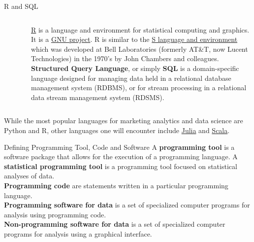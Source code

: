 \documentclass[pdf]{beamer}
\newcommand{\empr}[1]{{\color{franklinblue}\textbf{#1}}}
\theoremstyle{remark}
\theoremstyle{definition}
\begin{document}
\begin{frame}[t]{R and SQL}
\begin{columns}[T]
\begin{column}{0.2\textwidth}
\begin{figure}[htbp]
  \captionsetup{justification=centering}
  \includegraphics[height=1.0cm, trim=0.1cm 0.1cm 0.1cm 0.1cm width=1.0cm]{Images/R.jpg}
\end{figure}
\end{column}
\begin{column}{0.7\textwidth}  %
\href{https://www.r-project.org/about.html}{R} is a language and environment for statistical computing and graphics.  It is a \href{https://www.gnu.org/gnu/thegnuproject.html}{GNU project}. R is similar to the \href{https://web.archive.org/web/20181014111802/http://ect.bell-labs.com/sl/S/}{S language and environment} which was developed at Bell Laboratories (formerly AT\&T, now Lucent Technologies) in the 1970's by John Chambers and colleagues. \\
\vspace{1.5ex}
\empr{Structured Query Language}, or simply \empr{SQL} is a domain-specific language designed for managing data held in a relational database management system (RDBMS), or for stream processing in a relational data stream management system (RDSMS). %
\end{column}
\end{columns}
\vspace{0.0ex} 
While the most popular languages for marketing analytics and data science are Python and R, other languages  one will encounter include \href{https://julialang.org/}{Julia} and \href{https://www.scala-lang.org/}{Scala}. 
\end{frame}

\begin{frame}[t]{Defining Programming Tool, Code and Software}
A \empr{programming tool} is a software package that allows for the execution of a programming language. A \empr{statistical programming tool} is a programming tool focused on statistical analyses of data. \\
\vspace{1.5ex}
\empr{Programming code} are statements written in a particular programming language. \\
\vspace{1.5ex}
\empr{Programming software for data} is a set of specialized computer programs for analysis using programming code.\\
\vspace{1.5ex}
\empr{Non-programming software for data} is a set of specialized computer programs for analysis using a graphical interface.
\vspace{1.5ex}
\end{frame}
\end{document}
